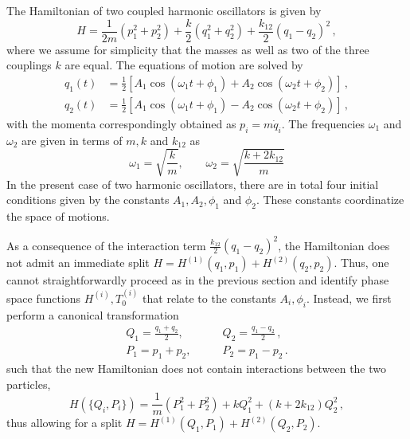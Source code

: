 \documentclass[onecolumn,notitlepage,superscriptaddress, nofootinbib,nobibnotes, aps,prd,10pt]{revtex4-1}%
\begin{document}
The Hamiltonian of two coupled harmonic oscillators is given by
%
\begin{equation}
H = \frac{1}{2m}\left(p_1^2+p_2^2\right)+\frac{k}{2}\left(q_1^2+q_2^2\right)+\frac{k_{12}}{2}(q_1-q_2)^2\, ,
\end{equation}
%
where we assume for simplicity that the masses as well as two of the three couplings $k$ are equal. The equations of motion are solved by
%
\begin{subequations}
\begin{align}
    q_1(t)&=\frac{1}{2}\left[A_1\cos(\omega_1 t+\phi_1)+A_2\cos(\omega_2 t+\phi_2)\right]\,, \\[7pt]
    q_2(t)&=\frac{1}{2}\left[A_1\cos(\omega_1 t+\phi_1)-A_2\cos(\omega_2 t+\phi_2)\right]\,,
\end{align}
\end{subequations}
%
with the momenta correspondingly obtained as $p_i = m\dot{q}_i$. The frequencies $\omega_1$ and $\omega_2$ are given in terms of $m,k$ and $k_{12}$ as
%
\begin{equation}
\omega_1 = \sqrt{\frac{k}{m}},\qquad \omega_2 = \sqrt{\frac{k+2k_{12}}{m}}
\end{equation}
%
In the present case of two harmonic oscillators, there are in total four initial conditions given by the constants $A_1,A_2,\phi_1$ and $\phi_2$. These constants coordinatize the space of motions.

As a consequence of the interaction term $\frac{k_{12}}{2}(q_1-q_2)^2$, the Hamiltonian does not admit an immediate split $H = H^{(1)}(q_1,p_1)+H^{(2)}(q_2,p_2)$. Thus, one cannot straightforwardly proceed as in the previous section and identify phase space functions $H^{(i)},T_0^{(i)}$ that relate to the constants $A_i,\phi_i$. Instead, we first perform a canonical transformation
%
\begin{subequations}
\begin{align}
  Q_1 = \frac{q_1+q_2}{2},\qquad & Q_2 = \frac{q_1-q_2}{2}\,,\\[7pt]
P_1 = p_1+p_2,\qquad & P_2 = p_1-p_2\,.  
\end{align}
\end{subequations}
%
such that the new Hamiltonian does not contain interactions between the two particles,
%
\begin{equation}
H(\{Q_i,P_i\}) = \frac{1}{m}\left(P_1^2+P_2^2\right)+kQ_1^2 + (k+2k_{12})Q_2^2\, , 
\end{equation}
%
thus allowing for a split $H = H^{(1)}(Q_1,P_1)+H^{(2)}(Q_2,P_2)$. 
\end{document}
